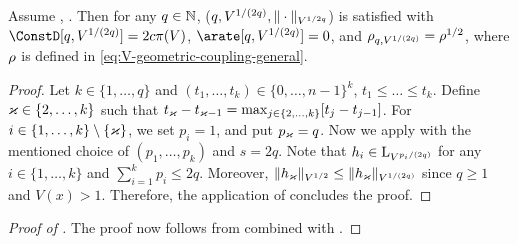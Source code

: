 \begin{corollary}
\label{coro:centered_moments_V_class}
Assume , . Then for any $q \in \nset$, ($q,V^{1/(2q)},\Vnorm[V^{1/2q}]{\cdot}$) is satisfied with $\ConstD[q,V^{1/(2q)}] = 2 \cmconstv \pi(V)$, $\arate[q,V^{1/(2q)}] = 0$, and $\rho_{q,V^{1/(2q)}} = \ratev^{1/2}$, where $\ratev$ is defined in \eqref{eq:V-geometric-coupling-general}.
\end{corollary}
\begin{proof}
  Let $k \in \{1,\ldots,q\}$ and
 $(t_1,\dots,t_{k}) \in \{0,\ldots,n-1\}^{k}$, $t_1 \leq \dots\leq t_{k}$.
  Define $\maxind \in \{2,\ldots,k\}$ such that $t_{\maxind} - t_{\maxind-1} = \max_{j \in \{2,\ldots,k\}} [t_j - t_{j-1}]$. For $i \in \{1,\ldots,k\} \setminus \{\maxind\}$, we set $p_{i} = 1$, and put $p_{\maxind} = q$.
  Now we apply  with the mentioned choice of $(p_1,\dots, p_k)$ and $s = 2q$.  Note that $ h_i \in \mrl_{V^{p_i/(2q)}}$ for any $i \in \{1,\ldots,k\}$ and $\sum_{i=1}^k p_i \leq 2q$. Moreover, $\|h_{\maxind}\|_{V^{1/2}} \leq \|h_{\maxind}\|_{V^{1/(2q)}}$ since $q \geq 1$ and $V(x) > 1$. Therefore, the application of   concludes the proof.
\end{proof}

\begin{proof}[Proof of ] The proof now follows from  combined with .
\end{proof}

